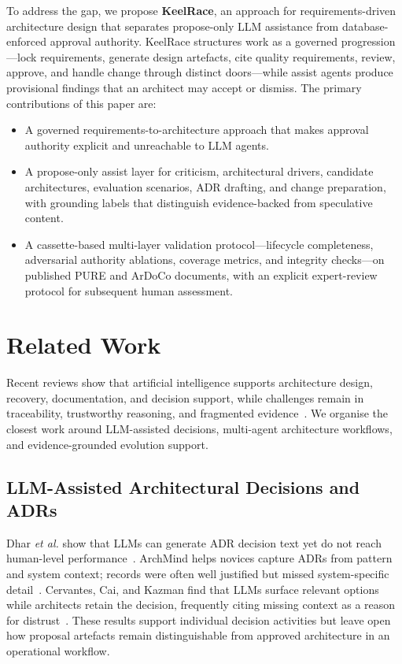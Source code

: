 \documentclass[conference]{IEEEtran}
\begin{document}
To address the gap, we propose \textbf{KeelRace}, an approach for requirements-driven architecture design that separates propose-only LLM assistance from database-enforced approval authority.
KeelRace structures work as a governed progression---lock requirements, generate design artefacts, cite quality requirements, review, approve, and handle change through distinct doors---while assist agents produce provisional findings that an architect may accept or dismiss.
The primary contributions of this paper are:
\begin{itemize}
\item A governed requirements-to-architecture approach that makes approval authority explicit and unreachable to LLM agents.
\item A propose-only assist layer for criticism, architectural drivers, candidate architectures, evaluation scenarios, ADR drafting, and change preparation, with grounding labels that distinguish evidence-backed from speculative content.
\item A cassette-based multi-layer validation protocol---lifecycle completeness, adversarial authority ablations, coverage metrics, and integrity checks---on published PURE and ArDoCo documents, with an explicit expert-review protocol for subsequent human assessment.
\end{itemize}

\section{Related Work}

Recent reviews show that artificial intelligence supports architecture design, recovery, documentation, and decision support, while challenges remain in traceability, trustworthy reasoning, and fragmented evidence~\cite{bucaioni2025ai}.
We organise the closest work around LLM-assisted decisions, multi-agent architecture workflows, and evidence-grounded evolution support.

\subsection{LLM-Assisted Architectural Decisions and ADRs}
Dhar \textit{et al.} show that LLMs can generate ADR decision text yet do not reach human-level performance~\cite{dhar2024adr}.
ArchMind helps novices capture ADRs from pattern and system context; records were often well justified but missed system-specific detail~\cite{pace2024archmind}.
Cervantes, Cai, and Kazman find that LLMs surface relevant options while architects retain the decision, frequently citing missing context as a reason for distrust~\cite{cervantes2026llms}.
These results support individual decision activities but leave open how proposal artefacts remain distinguishable from approved architecture in an operational workflow.
\end{document}
